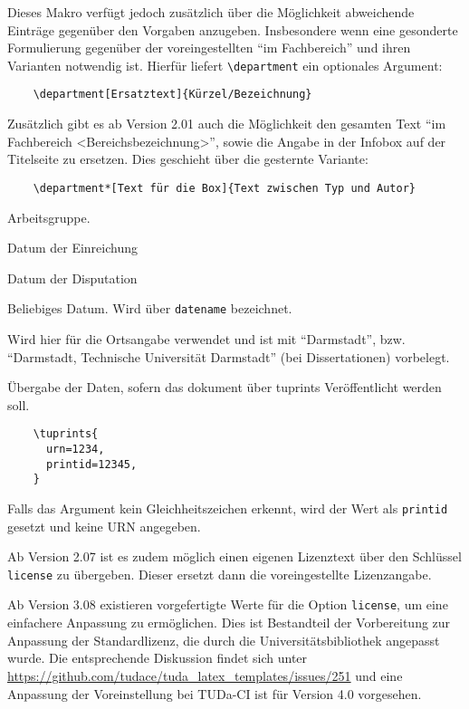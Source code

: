 \documentclass[
	ngerman,
	ruledheaders=section,%
	class=report,%
	thesis={type=bachelor},%
	accentcolor=9c,%
	custommargins=true,%
	marginpar=false,%
	parskip=half-,%
	fontsize=11pt,%
]{tudapub}
\let\code\texttt
\begin{document}
\begin{description}
	Dieses Makro verfügt jedoch zusätzlich über die Möglichkeit abweichende Einträge gegenüber den Vorgaben anzugeben. Insbesondere wenn eine gesonderte Formulierung gegenüber der voreingestellten \enquote{im Fachbereich} und ihren Varianten notwendig ist. Hierfür liefert \code{\textbackslash{}department} ein optionales Argument:

	\begin{verbatim}
	\department[Ersatztext]{Kürzel/Bezeichnung}
	\end{verbatim}
	Zusätzlich gibt es ab Version 2.01 auch die Möglichkeit den gesamten Text \enquote{im Fachbereich <Bereichsbezeichnung>}, sowie die Angabe in der Infobox auf der Titelseite zu ersetzen. Dies geschieht über die gesternte Variante:
	\begin{verbatim}
	\department*[Text für die Box]{Text zwischen Typ und Autor}
	\end{verbatim}
	\item[group] Arbeitsgruppe.
	\item[submissiondate] Datum der Einreichung
	\item[examdate] Datum der Disputation
	\item[date] Beliebiges Datum. Wird über \verb|datename| bezeichnet.
	\item[publishers] Wird hier für die Ortsangabe verwendet und ist mit \enquote{Darmstadt}, bzw. \enquote{Darmstadt, Technische Universität Darmstadt} (bei Dissertationen) vorbelegt.
	\item[tuprints] \label{page:tuprints}Übergabe der Daten, sofern das dokument über tuprints Veröffentlicht werden soll.
	\begin{verbatim}
	\tuprints{
	  urn=1234,
	  printid=12345,
	}
	\end{verbatim}
	Falls das Argument kein Gleichheitszeichen erkennt, wird der Wert als \code{printid} gesetzt und keine URN angegeben.

	Ab Version 2.07 ist es zudem möglich einen eigenen Lizenztext über den Schlüssel \verb|license| zu übergeben. Dieser ersetzt dann die voreingestellte Lizenzangabe.

	Ab Version 3.08 existieren vorgefertigte Werte für die Option \verb|license|, um eine einfachere Anpassung zu ermöglichen.
	Dies ist Bestandteil der Vorbereitung zur Anpassung der Standardlizenz, die durch die Universitätsbibliothek angepasst wurde.
	Die entsprechende Diskussion findet sich unter \url{https://github.com/tudace/tuda_latex_templates/issues/251} und eine Anpassung der Voreinstellung bei TUDa-CI ist für Version 4.0 vorgesehen.


\end{description}
\end{document}
